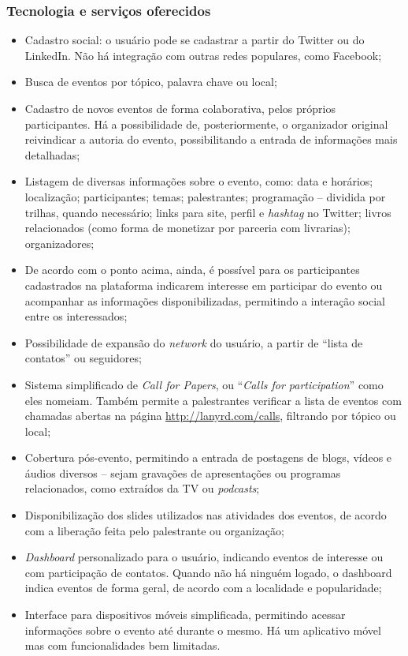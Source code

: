 \documentclass[12pt,a4paper,twoside,hyphens,english,brazil]{abntex2}
\begin{document}
\subsubsection*{Tecnologia e serviços oferecidos}
\begin{itemize}[itemsep=-1ex]
	\item Cadastro social: o usuário pode se cadastrar a partir do Twitter ou do LinkedIn. Não há integração com outras redes populares, como Facebook;
	\item Busca de eventos por tópico, palavra chave ou local;
	\item Cadastro de novos eventos de forma colaborativa, pelos próprios participantes. Há a possibilidade de, posteriormente, o organizador original reivindicar a autoria do evento, possibilitando a entrada de informações mais detalhadas;
	\item Listagem de diversas informações sobre o evento, como: data e horários; localização; participantes; temas; palestrantes; programação -- dividida por trilhas, quando necessário; links para site, perfil e \emph{hashtag} no Twitter; livros relacionados (como forma de monetizar por parceria com livrarias); organizadores;
	\item De acordo com o ponto acima, ainda, é possível para os participantes cadastrados na plataforma indicarem interesse em participar do evento ou acompanhar as informações disponibilizadas, permitindo a interação social entre os interessados;
	\item Possibilidade de expansão do \emph{network} do usuário, a partir de ``lista de contatos'' ou seguidores;
	\item Sistema simplificado de \emph{Call for Papers}, ou ``\emph{Calls for participation}'' como eles nomeiam. Também permite a palestrantes verificar a lista de eventos com chamadas abertas na página \url{http://lanyrd.com/calls}, filtrando por tópico ou local;
	\item Cobertura pós-evento, permitindo a entrada de postagens de blogs, vídeos e áudios diversos -- sejam gravações de apresentações ou programas relacionados, como extraídos da TV ou \emph{podcasts};
	\item Disponibilização dos slides utilizados nas atividades dos eventos, de acordo com a liberação feita pelo palestrante ou organização;
	\item \emph{Dashboard} personalizado para o usuário, indicando eventos de interesse ou com participação de contatos. Quando não há ninguém logado, o dashboard indica eventos de forma geral, de acordo com a localidade e popularidade;
	\item Interface para dispositivos móveis simplificada, permitindo acessar informações sobre o evento até durante o mesmo. Há um aplicativo móvel mas com funcionalidades bem limitadas.
\end{itemize}
\end{document}

